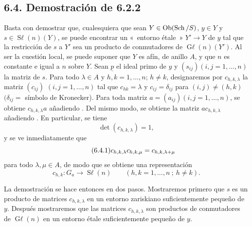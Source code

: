 \subsection*{6.4. Demostración de 6.2.2}
Basta con demostrar que, cualesquiera que sean
\(Y\in\operatorname{Ob}(\operatorname{Sch}/S)\), \(y\in Y\) y
\(s\in\operatorname{S\ell}(n)(Y)\), se puede encontrar un «~entorno
étale~» \(Y'\to Y\) de \(y\) tal que la restricción de \(s\) a \(Y'\) sea
un producto de conmutadores de \(\operatorname{G\ell}(n)(Y')\). Al ser la
cuestión local, se puede suponer que \(Y\) es afín, de anillo \(A\), y que
\(n\) es constante e igual a \(n\) sobre \(Y\). Sean \(\underline p\) el
ideal primo de \(y\) y \((s_{ij})(i,j=1,\ldots,n)\) la matriz de \(s\).
Para todo \(\lambda\in A\) y \(h, k=1,\ldots,n\); \(h\ne k\), designaremos
por \(c_{h,k,\lambda}\) la matriz \((c_{ij})\)
\((i,j=1,\ldots,n)\) tal que \(c_{hk}=\lambda\) y
\(c_{ij}=\delta_{ij}\) para \((i,j)\ne(h,k)\) \((\delta_{ij}=\) símbolo de
Kronecker). Para toda matriz \(a=(a_{ij})(i,j=1,\ldots,n)\), se obtiene
\(c_{h,k,\lambda}a\) añadiendo . Del mismo modo, se obtiene la matriz %
\(ac_{h,k,\lambda}\) añadiendo . En particular, se tiene
\[
 \det(c_{h,k,\lambda})=1,
\]
y se ve inmediatamente que
\begin{equation}\tag{\sisi{6.3.1}{6.4.1}} %
 c_{h,k,\lambda}c_{h,k,\mu}=c_{h,k,\lambda+\mu}
\end{equation}
para todo \(\lambda,\mu\in A\), de modo que se obtiene una representación
\[
 c_{h,k}:G_a\longrightarrow\operatorname{S\ell}(n)
 \qquad(h,k=1,\ldots,n\ ;\ h\ne k).
\]

La demostración se hace entonces en dos pasos. Mostraremos primero que \(s\)
es un producto de matrices \(c_{h,k,\lambda}\) en un entorno zariskiano
suficientemente pequeño de \(y\). Después mostraremos que las matrices
\(c_{h,k,\lambda}\) son productos de conmutadores de
\(\operatorname{G\ell}(n)\) en un entorno étale suficientemente pequeño de
\(y\).

